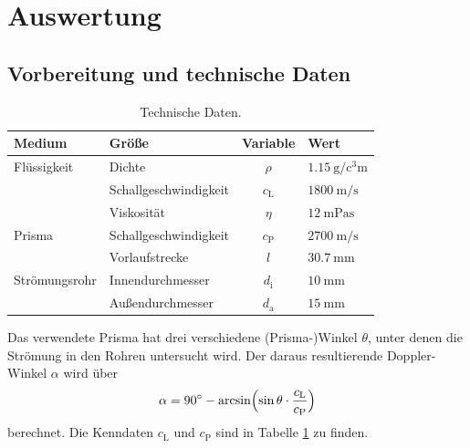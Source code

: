 \section{Auswertung}
\label{sec:Auswertung}

\subsection{Vorbereitung und technische Daten}

\begin{table}
    \centering
    \caption{Technische Daten.}
    \label{tab:techDaten}
    \begin{tabular}{l l c l}
        \toprule
        Medium          & Größe                 & Variable      & Wert                                      \\
        \midrule
        Flüssigkeit     & Dichte                & $\rho$        & $\SI{1.15}{\gram\per\cubic\centi\meter}$  \\
                        & Schallgeschwindigkeit & $c_\text{L}$  & $\SI{1800}{\meter\per\second}$            \\
                        & Viskosität            & $\eta$        & $\SI{12}{\milli\pascal\second}$           \\
        Prisma          & Schallgeschwindigkeit & $c_\text{P}$  & $\SI{2700}{\meter\per\second}$            \\
                        & Vorlaufstrecke        & $l$           & $\SI{30.7}{\milli\meter}$                 \\
        Strömungsrohr   & Innendurchmesser      & $d_\text{i}$  & $\SI{10}{\milli\meter}$                   \\
                        & Außendurchmesser      & $d_\text{a}$  & $\SI{15}{\milli\meter}$                   \\
        \bottomrule
    \end{tabular}
\end{table}

Das verwendete Prisma hat drei verschiedene (Prisma-)Winkel $\theta$, unter denen die Strömung in den Rohren untersucht wird. 
Der daraus resultierende Doppler-Winkel $\alpha$ wird über 
\begin{equation*}
    \alpha=\SI{90}{\degree}-\arcsin \Bigl(\sin \theta \cdot \frac{c_\text{L}}{c_\text{P}}\Bigr)
\end{equation*}
berechnet. Die Kenndaten $c_\text{L}$ und $c_\text{P}$ sind in Tabelle \ref{tab:techDaten} zu finden.

